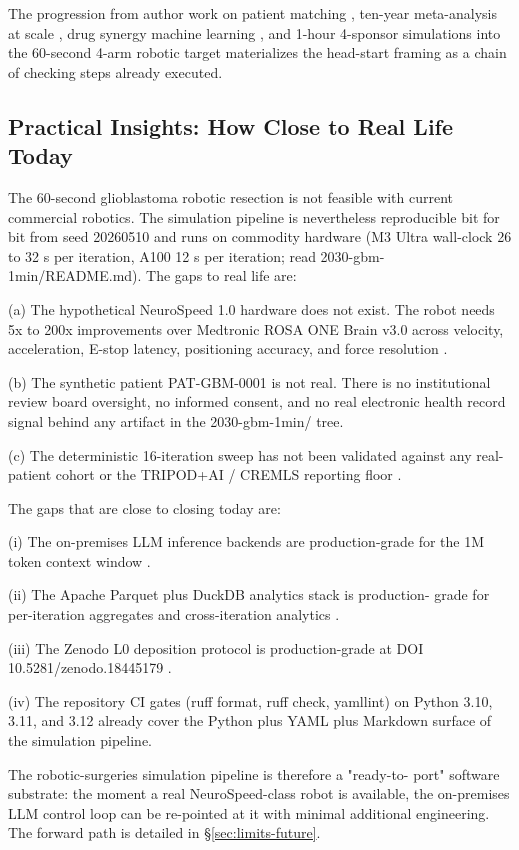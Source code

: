 The progression from author work on patient matching
\cite{kawchak_2025_17774560}, ten-year meta-analysis at scale
\cite{kawchak_2025_15549831}, drug synergy machine learning
\cite{kawchak_2025_17614396}, and 1-hour 4-sponsor simulations
\cite{kawchak_2026_19994945} into the 60-second 4-arm robotic target
\cite{repo-robotic-surgeries, one-minute-variant-instructions}
materializes the head-start framing as a chain of checking steps
already executed.

\subsection{Practical Insights: How Close to Real Life Today}
\label{sec:discussion-practical}

The 60-second glioblastoma robotic resection is not feasible with
current commercial robotics. The simulation pipeline is nevertheless
reproducible bit for bit from seed 20260510 and runs on commodity
hardware (M3 Ultra wall-clock 26 to 32 s per iteration, A100 12 s
per iteration; read 2030-gbm-1min/README.md). The gaps to real life
are:

(a) The hypothetical NeuroSpeed 1.0 hardware does not exist. The
robot needs 5x to 200x improvements over Medtronic ROSA ONE Brain
v3.0 across velocity, acceleration, E-stop latency, positioning
accuracy, and force resolution \cite{rosa-one-brain}.

(b) The synthetic patient PAT-GBM-0001 is not real. There is no
institutional review board oversight, no informed consent, and no
real electronic health record signal behind any artifact in the
2030-gbm-1min/ tree.

(c) The deterministic 16-iteration sweep has not been validated
against any real-patient cohort or the TRIPOD+AI / CREMLS reporting
floor \cite{Collins2024TRIPODAI, ElEmam2024CREMLS}.

The gaps that are close to closing today are:

(i) The on-premises LLM inference backends are production-grade for
the 1M token context window \cite{ollama, vllm, claude-opus-47}.

(ii) The Apache Parquet plus DuckDB analytics stack is production-
grade for per-iteration aggregates and cross-iteration analytics
\cite{apache-arrow, duckdb}.

(iii) The Zenodo L0 deposition protocol is production-grade at DOI
10.5281/zenodo.18445179 \cite{zenodo, repo-robotic-surgeries}.

\clearpage

(iv) The repository CI gates (ruff format, ruff check, yamllint) on
Python 3.10, 3.11, and 3.12 already cover the Python plus YAML plus
Markdown surface of the simulation pipeline.

The robotic-surgeries simulation pipeline is therefore a "ready-to-
port" software substrate: the moment a real NeuroSpeed-class robot
is available, the on-premises LLM control loop can be re-pointed at
it with minimal additional engineering. The forward path is detailed
in \S\ref{sec:limits-future}.
